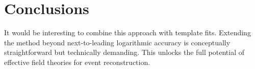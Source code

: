 \section{Conclusions}\label{sec:conclusions}

It would be interesting to combine this approach with template fits.
Extending the method beyond next-to-leading logarithmic accuracy is
conceptually straightforward but technically demanding. This unlocks the
full potential of effective field theories for event reconstruction.

